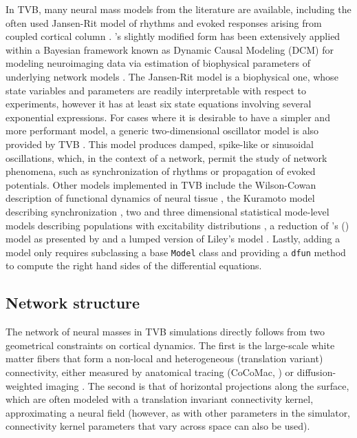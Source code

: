 \documentclass{bioinfo}
\begin{document}
In TVB, many neural mass models from the literature are available, including
the often used Jansen-Rit model of rhythms and evoked responses arising from
coupled cortical column \citep{Zetterberg_1978, Jansen_1995,Spiegler_2010}.
\citeauthor{David_2003}'s slightly modified form has been extensively applied
within a Bayesian framework known as Dynamic Causal Modeling (DCM) for modeling
neuroimaging data via estimation of biophysical parameters of underlying
network models \citep{David_2003, friston2003dynamic, david2006dynamic}.  The
Jansen-Rit model is a biophysical one, whose state variables and parameters are
readily interpretable with respect to experiments, however it has at least six
state equations involving several exponential expressions. For cases where it
is desirable to have a simpler and more performant model, a generic
two-dimensional oscillator model is also provided by TVB
\citep{strogatz2001nonlinear, guckenheimer1983nonlinear}.  This model produces
damped, spike-like or sinusoidal oscillations, which, in the context of a
network, permit the study of network phenomena, such as synchronization of
rhythms or propagation of evoked potentials.  Other models implemented in TVB
include the Wilson-Cowan description of functional dynamics of neural tissue
\citep{Wilson_1972}, the Kuramoto model describing synchronization
\citep{Kuramoto_1975, Cabral_2011}, two and three dimensional statistical
mode-level models describing populations with excitability distributions
\citep{Stefanescu_2011, Stefanescu_2008}, a reduction of
\citeauthor{Wong_2006}'s (\citeyear{Wong_2006}) model as presented by
\cite{Deco_2013} and a lumped version of Liley's model \citep{Liley_1999,
Steyn-Ross_1999}.  Lastly, adding a model only requires subclassing a base
\texttt{Model} class and providing a  \texttt{dfun} method to compute the right
hand sides of the differential equations. 

\subsection{Network structure}

The network of neural masses in TVB simulations directly follows from  two
 geometrical constraints on cortical dynamics. The first is the
large-scale white matter fibers that form a non-local and heterogeneous
(translation variant) connectivity, either measured by anatomical tracing
(CoCoMac, \cite{Koetter_2004}) or diffusion-weighted imaging 
\citep{Hagmann_2008, Honey_2009, Bastiani_2012}.
The second is that of horizontal projections
along the surface, which are often modeled with a translation invariant
connectivity kernel, approximating a neural field (however, as with other
parameters in the simulator, connectivity kernel parameters that vary 
across space can also be used).
\end{document}
